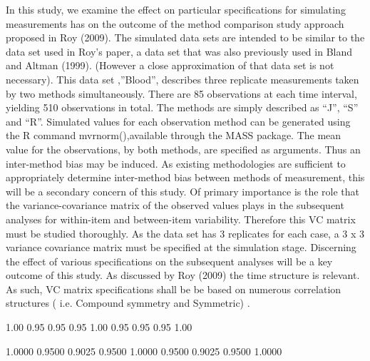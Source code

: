 In this study, we examine the effect on particular specifications for simulating measurements has on the outcome of the method comparison study approach proposed in Roy (2009).
The simulated data sets are intended to be similar to the data set used in Roy’s paper, a data set  that was also previously used in Bland and Altman (1999). (However a close approximation of that data set is not necessary). This data set ,”Blood”, describes three replicate measurements taken by two methods simultaneously. There are 85 observations at each time interval, yielding 510 observations in total. The methods  are simply described as “J”, “S” and “R”.
Simulated values for each observation method can be generated using the R command  mvrnorm(),available through the MASS package.
The mean value for the observations, by both methods, are specified as arguments. Thus an inter-method bias may be induced.  As existing methodologies are sufficient to appropriately determine inter-method bias between methods of measurement,  this will be a secondary concern of this study.
Of primary importance is the role that the variance-covariance matrix of the observed values plays in the subsequent analyses for within-item and between-item variability. Therefore this VC matrix must be studied thoroughly.
As the data set has 3 replicates for each case, a 3 x 3 variance covariance matrix must be specified at the simulation stage.  Discerning the effect of various specifications on the subsequent analyses will be a key outcome of this study.
As discussed by Roy (2009) the time structure is relevant. As such,  VC matrix specifications shall be be based on numerous correlation structures ( i.e. Compound symmetry and Symmetric) .

1.00 0.95 0.95
0.95 1.00 0.95
0.95 0.95 1.00

 


1.0000 0.9500 0.9025
0.9500 1.0000 0.9500
0.9025 0.9500 1.0000

 


